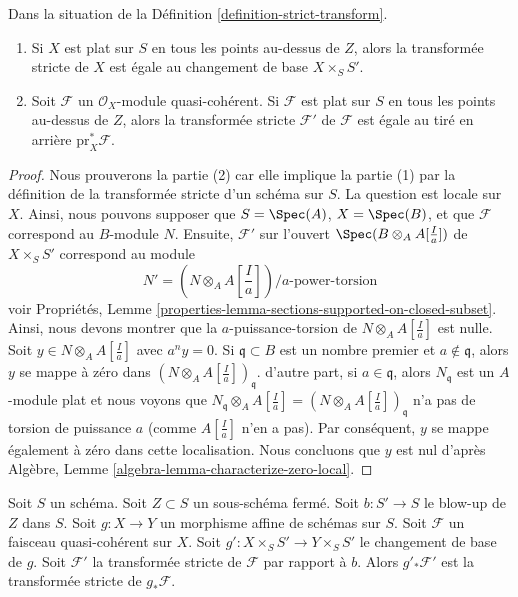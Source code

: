 \begin{lemma}
\label{lemma-strict-transform-flat}
Dans la situation de la Définition  \ref{definition-strict-transform}.
\begin{enumerate}
\item Si  $X$  est plat sur  $S$  en tous les points au-dessus de
 $Z$, alors la transformée stricte de  $X$  est égale au changement
de base  $X \times_S S'$.
\item Soit  $\mathcal{F}$  un  $\mathcal{O}_X$-module quasi-cohérent. Si  $\mathcal{F}$  est plat
sur  $S$  en tous les points au-dessus de  $Z$, alors la
transformée stricte  $\mathcal{F}'$  de  $\mathcal{F}$  est égale au tiré en arrière
 $\text{pr}_X^*\mathcal{F}$.
\end{enumerate}
\end{lemma}

\begin{proof}
Nous prouverons la partie (2) car elle implique la partie (1) par la définition de
la transformée stricte d'un schéma sur  $S$. La question est locale sur
 $X$. Ainsi, nous pouvons supposer que  $S = \Spec(A)$,  $X = \Spec(B)$, et que
 $\mathcal{F}$  correspond au  $B$-module  $N$. Ensuite,  $\mathcal{F}'$ 
sur l'ouvert  $\Spec(B \otimes_A A[\frac{I}{a}])$  de  $X \times_S S'$  correspond au module
$$
N' = (N \otimes_A A[\textstyle{\frac{I}{a}}])/a\text{-power-torsion}
$$
voir Propriétés, Lemme  \ref{properties-lemma-sections-supported-on-closed-subset}. Ainsi, nous devons montrer que la
 $a$-puissance-torsion de  $N \otimes_A A[\frac{I}{a}]$  est nulle. Soit  $y \in N \otimes_A A[\frac{I}{a}]$  avec
 $a^n y = 0$. Si  $\mathfrak q \subset B$  est un nombre premier et  $a \not \in \mathfrak q$, alors
 $y$  se mappe à zéro dans  $(N \otimes_A A[\frac{I}{a}])_\mathfrak q$. d'autre part, si  $a \in \mathfrak q$,
alors  $N_\mathfrak q$  est un  $A$-module plat et nous voyons que  $N_\mathfrak q \otimes_A A[\frac{I}{a}]
=(N \otimes_A A[\frac{I}{a}])_\mathfrak q$ 
n'a pas de torsion de puissance  $a$ (comme  $A[\frac{I}{a}]$  n'en a pas). Par
conséquent,  $y$  se mappe également à zéro dans cette localisation. Nous
concluons que  $y$  est nul d'après Algèbre, Lemme  \ref{algebra-lemma-characterize-zero-local}.
\end{proof}

\begin{lemma}
\label{lemma-strict-transform-affine}
Soit  $S$  un schéma. Soit  $Z \subset S$  un sous-schéma fermé. Soit
 $b : S' \to S$  le blow-up de  $Z$  dans  $S$. Soit  $g : X \to Y$  un
morphisme affine de schémas sur  $S$. Soit  $\mathcal{F}$  un faisceau
quasi-cohérent sur  $X$. Soit  $g' : X \times_S S' \to Y \times_S S'$  le changement de base de
 $g$. Soit  $\mathcal{F}'$  la transformée stricte de  $\mathcal{F}$  par rapport
à  $b$. Alors  $g'_*\mathcal{F}'$  est la transformée stricte de  $g_*\mathcal{F}$.
\end{lemma}

